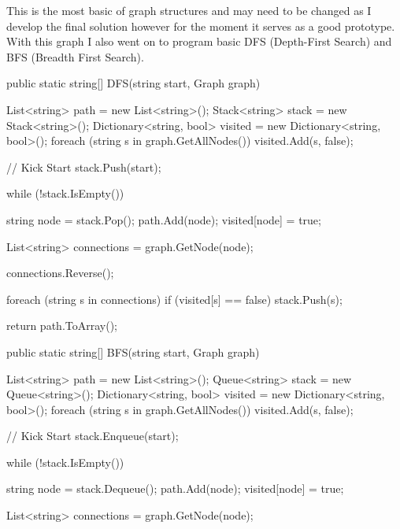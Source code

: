 \begin{FlushLeft}

        This is the most basic of graph structures and may need to be changed as I develop the final solution however for the moment it serves as a good prototype. With this graph I also went on to program basic DFS (Depth-First Search) and BFS (Breadth First Search). \\ \bk

        \begin{cscode}
public static string[] DFS(string start, Graph graph)
{
    List<string> path = new List<string>();
    Stack<string> stack = new Stack<string>();
    Dictionary<string, bool> visited = new Dictionary<string, bool>();
    foreach (string s in graph.GetAllNodes()) visited.Add(s, false);

    // Kick Start
    stack.Push(start);

    while (!stack.IsEmpty())
    {

        string node = stack.Pop();
        path.Add(node);
        visited[node] = true;

        List<string> connections = graph.GetNode(node);

        connections.Reverse();

        foreach (string s in connections)
        {
            if (visited[s] == false)
            {
                stack.Push(s);
            }
        }
    }


    return path.ToArray();
}

public static string[] BFS(string start, Graph graph)
{
    List<string> path = new List<string>();
    Queue<string> stack = new Queue<string>();
    Dictionary<string, bool> visited = new Dictionary<string, bool>();
    foreach (string s in graph.GetAllNodes()) visited.Add(s, false);

    // Kick Start
    stack.Enqueue(start);

    while (!stack.IsEmpty())
    {

        string node = stack.Dequeue();
        path.Add(node);
        visited[node] = true;

        List<string> connections = graph.GetNode(node);

}}
\end{cscode}
\end{FlushLeft}
